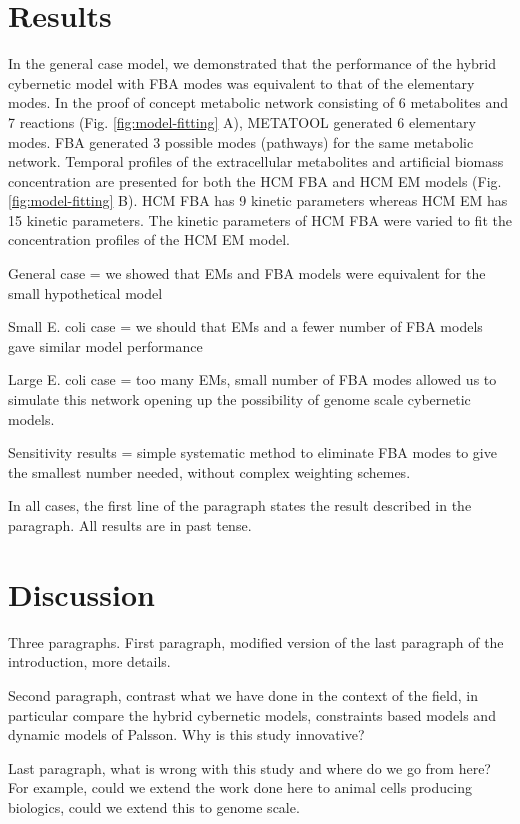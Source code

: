 \documentclass[10pt,twocolumn,twoside,final]{IEEEtran}
\begin{document}
\section{Results}
In the general case model, we demonstrated that the performance of the hybrid cybernetic model with FBA modes was equivalent to that of the elementary modes. In the proof of concept metabolic network consisting of 6 metabolites and 7 reactions (Fig. \ref{fig:model-fitting} A), METATOOL generated 6 elementary modes. FBA generated 3 possible modes (pathways) for the same metabolic network. Temporal profiles of the extracellular metabolites and artificial biomass concentration are presented for both the HCM FBA and HCM EM models (Fig. \ref {fig:model-fitting} B).  HCM FBA has 9 kinetic parameters whereas HCM EM has 15 kinetic parameters. The kinetic parameters of HCM FBA were varied to fit the concentration profiles of the HCM EM model. 

General case = we showed that EMs and FBA models were equivalent for the small hypothetical model

Small E. coli case = we should that EMs and a fewer number of FBA models gave similar model performance

Large E. coli case = too many EMs, small number of FBA modes allowed us to simulate this network opening up the possibility of genome scale cybernetic models.

Sensitivity results = simple systematic method to eliminate FBA modes to give the smallest number needed, without complex weighting schemes.

In all cases, the first line of the paragraph states the result described in the paragraph. All results are in past tense.



\section{Discussion}
Three paragraphs.
First paragraph, modified version of the last paragraph of the introduction, more details.

Second paragraph, contrast what we have done in the context of the field, in particular compare the hybrid cybernetic models, constraints based models and dynamic models of
Palsson. Why is this study innovative?

Last paragraph, what is wrong with this study and where do we go from here? For example,
could we extend the work done here to animal cells producing biologics, could we extend this to genome scale.
\end{document}
